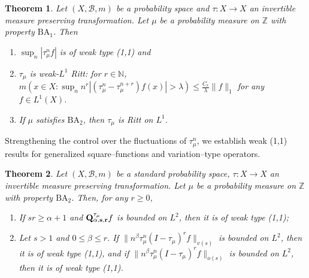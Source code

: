 \documentclass[11pt]{amsart}
\newtheorem{thm}{Theorem}[section]
\theoremstyle{definition}
\theoremstyle{remark}
\begin{document}
\begin{thm} \label{thm:weak} %
\cite{Cuny-weak} 
Let $(X,\mathcal B,m)$ be a probability space and $\tau:X\to X$ an invertible measure preserving transformation.
Let $\mu$ be a probability measure on $\mathbb Z$ with property $\text{BA}_1$. Then 
\begin{enumerate}
\item $\sup_n |\tau_{\mu}^n f|$ is of weak type (1,1) and 
\item  $\tau_{\mu}$ is weak-$L^1$ Ritt: for $r\in \mathbb N$,   
$ m(x\in X: \sup_n n^r |(\tau_{\mu}^n-\tau_{\mu}^{n+r})f(x)|>\lambda) \le \frac{C_r}{\lambda} \lVert f\rVert_1$
for any $f\in L^1(X)$.
\item If  $\mu$ satisfies $\text{BA}_2$, then $\tau_{\mu}$ is Ritt on $L^1$.
\end{enumerate}
\end{thm} 
  
Strengthening the control over the fluctuations of $\tau_{\mu}^n$, we establish weak (1,1) results for generalized square--functions and variation--type operators.

\begin{thm} \label{thm:RittResult.mp} Let $(X,\mathcal B,m)$ be a standard probability space, $\tau:X\to X$ an invertible measure preserving transformation. Let $\mu$ be a probability measure on $\mathbb Z$ with property $\text{BA}_2$. Then, for any $r\ge  0$,
\begin{enumerate}
\item[A.] 
If $sr\ge \alpha+1$ and ${\bf Q^{\tau_{\mu}}_{\alpha,s,r}}f$ is bounded on $L^2$, then 
it is of weak type (1,1); 
\item[B.] Let $s> 1$ and $0\le \beta\le r$. If $ \lVert  n^{\beta} \tau_{\mu}^n (I-\tau_{\mu})^r f \rVert_{v(s)}$  is bounded on $L^2$, then it is of weak type (1,1),
and if $\lVert n^{\beta}  \tau_{\mu}^n (I-\tau_{\mu})^r  f\rVert_{o(s)}$ is bounded on $L^2$, then it is of weak type (1,1).
\end{enumerate}
\end{thm}
\end{document}
